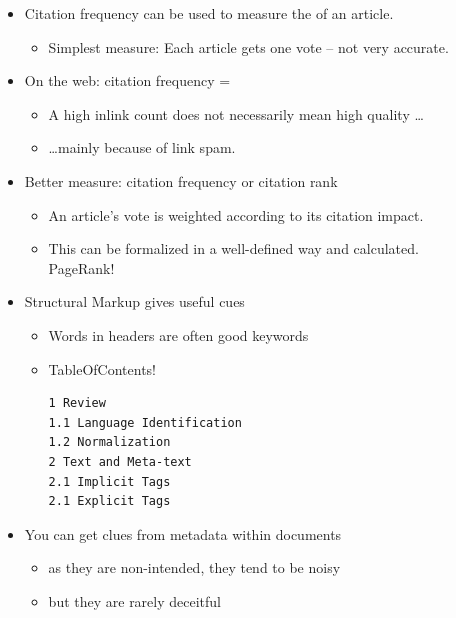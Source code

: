 \documentclass[a4paper,landscape,headrule,footrule,xetex]{foils}
\begin{document}

\begin{itemize}
\item Citation frequency can be used to measure
  the  of an article.
\begin{itemize}
\item Simplest measure: Each article gets one vote -- not
  very accurate.
\end{itemize}
\item On the web: citation frequency = 
\begin{itemize}
\item A high inlink count does not necessarily
  mean high quality \ldots
\item \ldots mainly because of link spam.
\end{itemize}
\item Better measure:  citation frequency or citation rank
\begin{itemize}
\item An article's vote is weighted according to its
  citation impact. 
\item This  can be formalized in a well-defined way and calculated.
  \\ PageRank!
\end{itemize}
\end{itemize}


 \begin{itemize}
 \item Structural Markup gives useful cues
   \begin{itemize}
   \item Words in headers are often good keywords
   \item TableOfContents!
\begin{verbatim}
1 Review
1.1 Language Identification
1.2 Normalization
2 Text and Meta-text
2.1 Implicit Tags
2.1 Explicit Tags
\end{verbatim}
   \end{itemize}


 \end{itemize}


\begin{itemize}
\item You can get clues from metadata within documents
  \begin{itemize}
  \item as they are non-intended, they tend to be noisy
  \item but they are rarely deceitful
  \end{itemize}
\end{itemize}
\end{document}
